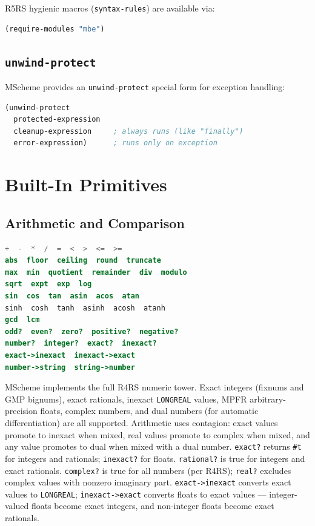 \documentclass[12pt]{report}
\begin{document}
R5RS hygienic macros ({\tt syntax-rules}) are available via:

\begin{lstlisting}[language=Scheme]
(require-modules "mbe")
\end{lstlisting}

\subsection{{\tt unwind-protect}}

MScheme provides an {\tt unwind-protect} special form for exception handling:

\begin{lstlisting}[language=Scheme]
(unwind-protect
  protected-expression
  cleanup-expression     ; always runs (like "finally")
  error-expression)      ; runs only on exception
\end{lstlisting}


\section{Built-In Primitives}\label{sec:primitives}

\subsection{Arithmetic and Comparison}

\begin{lstlisting}[language=Scheme]
+  -  *  /  =  <  >  <=  >=
abs  floor  ceiling  round  truncate
max  min  quotient  remainder  div  modulo
sqrt  expt  exp  log
sin  cos  tan  asin  acos  atan
sinh  cosh  tanh  asinh  acosh  atanh
gcd  lcm
odd?  even?  zero?  positive?  negative?
number?  integer?  exact?  inexact?
exact->inexact  inexact->exact
number->string  string->number
\end{lstlisting}

MScheme implements the full R4RS numeric tower.  Exact integers
(fixnums and GMP bignums), exact rationals, inexact {\tt LONGREAL}
values, MPFR arbitrary-precision floats, complex numbers, and dual
numbers (for automatic differentiation) are all supported.
Arithmetic uses contagion: exact values promote to inexact when mixed,
real values promote to complex when mixed, and any value promotes to
dual when mixed with a dual number.
{\tt exact?} returns {\tt \#t} for integers and
rationals; {\tt inexact?} for floats.  {\tt rational?} is true for
integers and exact rationals.  {\tt complex?} is true for all
numbers (per R4RS); {\tt real?} excludes complex values with nonzero
imaginary part.  {\tt exact->inexact} converts exact values to
{\tt LONGREAL}; {\tt inexact->exact} converts floats to exact values
--- integer-valued floats become exact integers, and non-integer floats
become exact rationals.
\end{document}
